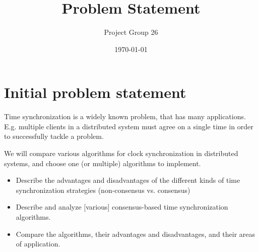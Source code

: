 \documentclass{article}
\title{Problem Statement}
\author{Project Group 26}
\date{\today}
\begin{document}
\maketitle

\section{Initial problem statement}

Time synchronization is a widely known problem, that has many applications. E.g. multiple clients in a distributed system must agree on a single time in order to successfully tackle a problem. 

We will compare various algorithms for clock synchronization in  distributed systems, and choose one (or multiple) algorithms to implement.

\begin{itemize}
    \item Describe the advantages and disadvantages of the different kinds of time synchronization strategies (non-consensus vs. consensus)
    \item Describe and analyze [various] consensus-based time synchronization algorithms.
    \item Compare the algorithms, their advantages and disadvantages, and their areas of application.
\end{itemize}
\end{document}
